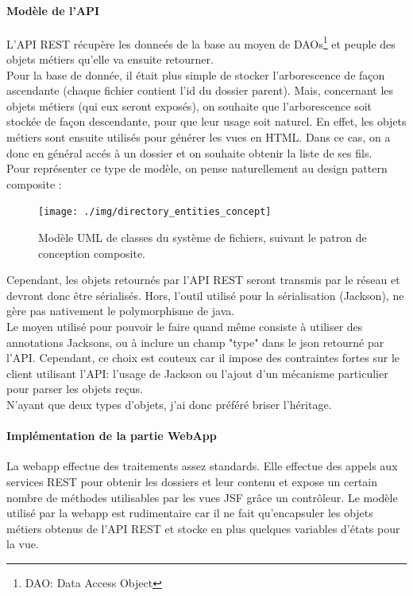 \paragraph*{Modèle de l'API\\}
L'API REST récupère les donneés de la base au moyen de DAOs\footnote{DAO: Data Access Object} et peuple des objets métiers qu'elle va ensuite retourner.\\

Pour la base de donnée, il était plus simple de stocker l'arborescence de façon ascendante (chaque fichier contient l'id du dossier parent). Mais, concernant les objets métiers (qui eux seront exposés), on souhaite que l'arborescence soit stockée de façon descendante, pour que leur usage soit naturel.
En effet, les objets métiers sont ensuite utilisés pour générer les vues en HTML. Dans ce cas, on a donc en général accés à un dossier et on souhaite obtenir la liste de ses fils. \\

Pour représenter ce type de modèle, on pense naturellement au design pattern composite \cite{bib:compositePattern} : \\
\begin{figure}[H]
  \centering
  \texttt{[image: ./img/directory\_entities\_concept]}
  \caption{\label{fig:mb_va_ast} Modèle UML de classes du système de fichiers, suivant le patron de conception composite.}
\end{figure}

Cependant, les objets retournés par l'API REST seront transmis par le réseau et devront donc être sérialisés. Hors, l'outil utilisé pour la sérialisation (Jackson), ne gère pas nativement le polymorphisme de java. \\
Le moyen utilisé pour pouvoir le faire quand même consiste à utiliser des annotations Jacksons, ou à inclure un champ "type" dans le json retourné par l'API. Cependant, ce choix est couteux car il impose des contraintes fortes sur le client utilisant l'API: l'usage de Jackson ou l'ajout d'un mécanisme particulier pour parser les objets reçus.\\

N'ayant que deux types d'objets, j'ai donc préféré briser l'héritage.


\paragraph*{Implémentation de la partie WebApp\\}
La webapp effectue des traitements assez standards. Elle effectue des appels aux services REST pour obtenir les dossiers et leur contenu et expose un certain nombre de méthodes utilisables par les vues JSF grâce un contrôleur.
Le modèle utilisé par la webapp est rudimentaire car il ne fait qu'encapsuler les objets métiers obtenus de l'API REST et stocke en plus quelques variables d'états pour la vue.

